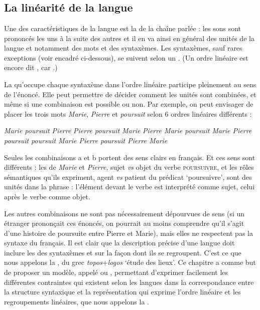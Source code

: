 \chapter{}\label{sec:3.5}

\section{La linéarité de la langue}\label{sec:3.5.0}

Une des caractéristiques de la langue est la  de la chaîne parlée : les sons sont prononcés les uns à la suite des autres et il en va ainsi en général des unités de la langue et notamment des mots et des syntaxèmes. Les syntaxèmes, sauf rares exceptions (voir encadré ci-dessous), se suivent selon un . (Un ordre linéaire est encore dit , car .)

La  qu’occupe chaque syntaxème dans l’ordre linéaire participe pleinement au sens de l’énoncé. Elle peut permettre de décider comment les unités sont combinées, et même si une combinaison est possible ou non. Par exemple, on peut envisager de placer les trois mots \textit{Marie}, \textit{Pierre} et \textit{poursuit} selon 6 ordres linéaires différents :

\ea\label{ex:poursuit}
\ea \textit{Marie poursuit Pierre}
\ex \textit{Pierre poursuit Marie}
\ex \textit{Pierre Marie poursuit}
\ex \textit{Marie Pierre poursuit}
\ex \textit{poursuit Marie Pierre}
\ex \textit{poursuit Pierre Marie}
\z
\z

Seules les combinaisons a et b portent des sens clairs en français. Et ces sens sont différents : les  de \textit{Marie} et \textit{Pierre}, sujet \textit{vs} objet du verbe \textsc{poursuivre}, et les rôles sémantiques qu’ils expriment, agent \textit{vs} patient du prédicat ‘poursuivre’, sont  des unités dans la phrase : l’élément devant le verbe est interprété comme sujet, celui après le verbe comme objet.

Les autres combinaisons ne sont pas nécessairement dépourvues de sens (si un étranger prononçait ces énoncés, on pourrait au moins comprendre qu’il s’agit d’une histoire de poursuite entre Pierre et Marie), mais elles ne respectent pas la syntaxe du français. Il est clair que la description précise d’une langue doit inclure les  des syntaxèmes et sur la façon dont ils se regroupent. C’est ce que nous appelons la , du grec \textit{topos}+\textit{logos} ‘étude des lieux’. Ce chapitre a comme but de proposer un modèle, appelé  ou , permettant d’exprimer facilement les différentes contraintes qui existent selon les langues dans la correspondance entre la structure syntaxique et la représentation qui exprime l’ordre linéaire et les regroupements linéaires, que nous appelons la .

